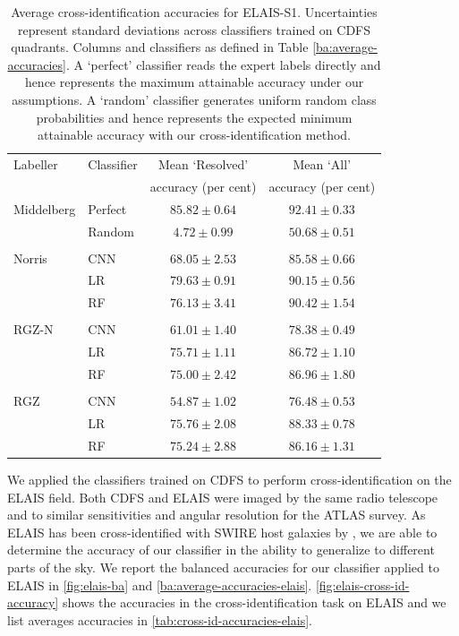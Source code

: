 \documentclass[fleqn,usenatbib,usedcolumn]{mnras}
\begin{document}
\begin{table}
    \caption{Average cross-identification accuracies for ELAIS-S1.
      Uncertainties represent standard deviations across classifiers trained
      on CDFS quadrants. Columns and classifiers as defined in Table
      \ref{ba:average-accuracies}.  A `perfect' classifier reads the expert
      labels directly and hence represents the maximum attainable accuracy
      under our assumptions. A `random' classifier generates uniform random
      class probabilities and hence represents the expected minimum attainable
      accuracy with our cross-identification method.}
      \label{tab:cross-id-accuracies-elais}
\begin{tabular}{llcc}
\hline
Labeller & Classifier  & Mean `Resolved' & Mean `All' \\
 & & accuracy (per cent) & accuracy (per cent)\\
\hline
Middelberg & Perfect & $85.82 \pm 0.64$ & $92.41 \pm 0.33$\\
           & Random  & $4.72 \pm 0.99$   & $50.68 \pm 0.51$\\
 \\
Norris & CNN     & $68.05 \pm 2.53$ & $85.58 \pm 0.66$\\
       & LR      & $79.63 \pm 0.91$ & $90.15 \pm 0.56$\\
       & RF      & $76.13 \pm 3.41$ & $90.42 \pm 1.54$\\
 \\
RGZ-N & CNN & $61.01 \pm 1.40$ & $78.38 \pm 0.49$\\
      & LR  & $75.71 \pm 1.11$ & $86.72 \pm 1.10$\\
      & RF  & $75.00 \pm 2.42$ & $86.96 \pm 1.80$\\
 \\
RGZ & CNN & $54.87 \pm 1.02$ & $76.48 \pm 0.53$\\
    & LR  & $75.76 \pm 2.08$ & $88.33 \pm 0.78$\\
    & RF  & $75.24 \pm 2.88$ & $86.16 \pm 1.31$\\
 \hline
\end{tabular}
\end{table}

We applied the classifiers trained on CDFS to perform cross-identification on
the ELAIS field. Both CDFS and ELAIS were imaged by the same radio telescope
and to similar sensitivities and angular resolution for the ATLAS survey.  As
ELAIS has been cross-identified with SWIRE host galaxies by
\citet{middelberg08}, we are able to determine the accuracy of our classifier
in the ability to generalize to different parts of the sky. We report the
balanced accuracies for our classifier applied to ELAIS in
\autoref{fig:elais-ba} and \autoref{ba:average-accuracies-elais}.
\autoref{fig:elais-cross-id-accuracy} shows the accuracies in the
cross-identification task on ELAIS and we list averages accuracies in
\autoref{tab:cross-id-accuracies-elais}.
\end{document}
